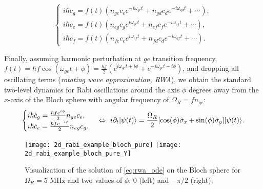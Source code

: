\begin{equation}
\begin{cases}
i\hbar \dot c_g =  f(t) (n_{ge} c_e e^{-i\omega_{ge}t}+ n_{gd} c_d  e^{-i\omega_{gd}t} + \cdots),\\
i\hbar \dot c_e =  f(t) (n_{eg} c_g e^{i\omega_{ge}t} + n_{ef} c_f e^{-i\omega_{ef}t}+ \cdots),\\
i\hbar \dot c_f =   f(t) (n_{fe} c_e e^{i\omega_{ef}t}+ n_{fd} c_d e^{-i\omega_{df}t} + \cdots).
\end{cases}
\label{eq:c_gef_ode_rf}
\end{equation}

Finally, assuming harmonic perturbation at $ge$ transition frequency, $f(t) = \hbar f \cos(\omega_{ge} t + \phi ) = \frac{\hbar f}{2}(e^{i\omega_{ge} t+i\phi} + e^{-i\omega_{ge} t-i\phi})$, and dropping all oscillating terms (\textit{rotating wave approximation, RWA}), we obtain the standard two-level dynamics for Rabi oscillations around the axis $\phi$ degrees away from the $x$-axis of the Bloch sphere with angular frequency of $\Omega_R = f n_{ge}$:
\begin{equation}
\begin{cases}
i\hbar \dot c_g =  \frac{\hbar fe^{i\phi}}{2} n_{ge} c_e,\\
i\hbar \dot c_e =   \frac{\hbar fe^{-i\phi}}{2} n_{eg} c_g.
\end{cases} \Leftrightarrow\  i\partial_t \lvert\psi (t)\rangle = \frac{\Omega_R}{2}[\cos(\phi)\hat \sigma_x + \sin(\phi)\hat \sigma_y]\lvert\psi(t)\rangle.
\label{eq:rwa_ode}
\end{equation}

\begin{figure}
\centering
\texttt{[image: 2d\_rabi\_example\_bloch\_pure]}\quad
\texttt{[image: 2d\_rabi\_example\_bloch\_pure\_Y]}
\caption{Visualization of the solution of \eqref{eq:rwa_ode} on the Bloch sphere for $\Omega_R=5$ MHz and two values of $\phi$: 0 (left) and $-\pi/2$ (right).}
\label{fig:bloch_rot}
\end{figure}


